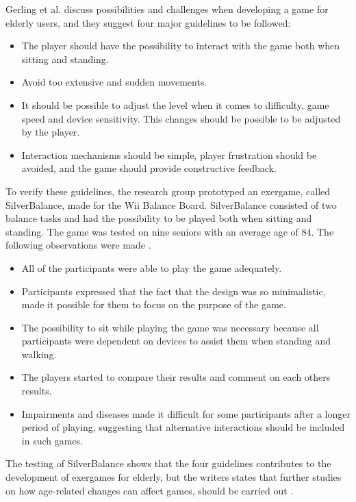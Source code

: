 Gerling et al. \cite{gerling1} discuss possibilities and challenges when developing a game for elderly users, and they suggest four major guidelines to be followed:
\begin{itemize}
\item The player should have the possibility to interact with the game both when sitting and standing. 
\item Avoid too extensive and sudden movements.
\item It should be possible to adjust the level when it comes to difficulty, game speed and device sensitivity. This changes should be possible to be adjusted by the player. 
\item Interaction mechanisms should be simple, player frustration should be avoided, and the game should provide constructive feedback.
\end{itemize}

To verify these guidelines, the research group prototyped an exergame, called SilverBalance, made for the Wii Balance Board. SilverBalance consisted of two balance tasks and had the possibility to be played both when sitting and standing. The game was tested on nine seniors with an average age of 84. The following observations were made \cite{gerling1}.
\begin{itemize}
\item All of the participants were able to play the game adequately. 
\item Participants expressed that the fact that the design was so minimalistic, made it possible for them to focus on the purpose of the game. 
\item The possibility to sit while playing the game was necessary because all participants were dependent on devices to assist them when standing and walking.
\item The players started to compare their results and comment on each others results.
\item Impairments and diseases made it difficult for some participants after a longer period of playing, suggesting that alternative interactions should be included in such games.
\end{itemize}

The testing of SilverBalance shows that the four guidelines contributes to the development of exergames for elderly, but the writers states that further studies on how age-related changes can affect games, should be carried out \cite{gerling1}.

